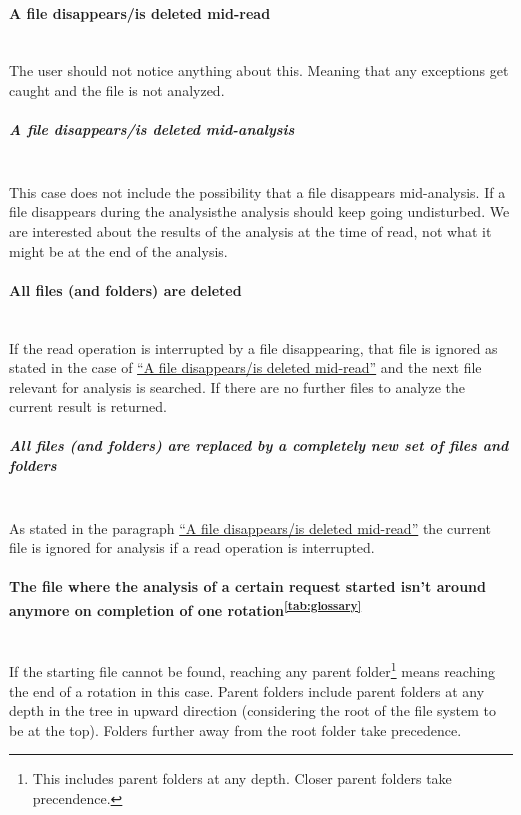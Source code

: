 \documentclass[11pt]{article} %
\begin{document}
    \paragraph{A file disappears/is deleted mid-read}\label{par:file_disappear} ~\\
    The user should not notice anything about this. Meaning that any exceptions get caught and the file is not analyzed.


    \subparagraph{A file disappears/is deleted mid-analysis} ~\\
    This case does not include the possibility that a file disappears mid-analysis. If a file disappears during the analysisthe analysis should keep going undisturbed. We are interested about the results of the analysis at the time of read, not what it might be at the end of the analysis.


    \paragraph{All files (and folders) are deleted}\label{par:everything_deleted} ~\\
    If the read operation is interrupted by a file disappearing, that file is ignored as stated in the case of \hyperref[par:file_disappear]{``A file disappears/is deleted mid-read''} and the next file relevant for analysis is searched. If there are no further files to analyze the current result is returned.


    \subparagraph{All files (and folders) are replaced by a completely new set of files and folders} ~\\
    As stated in the paragraph \hyperref[par:file_disappear]{``A file disappears/is deleted mid-read''} the current file is ignored for analysis if a read operation is interrupted.


    \paragraph{The file where the analysis of a certain request started isn't around anymore on completion of one rotation\textsuperscript{\ref{tab:glossary}}} ~\\
    If the starting file cannot be found, reaching any parent folder\footnote{This includes parent folders at any depth. Closer parent folders take precendence.} means reaching the end of a rotation in this case. Parent folders include parent folders at any depth in the tree in upward direction (considering the root of the file system to be at the top). Folders further away from the root folder take precedence.
\end{document}
